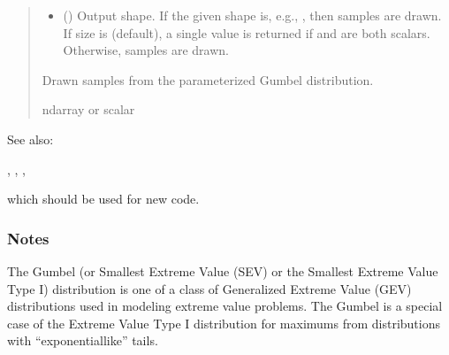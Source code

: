 \documentclass[letterpaper,10pt,english]{sphinxmanual}
\begin{document}
\begin{fulllineitems}
\begin{quote}
\begin{description}
\begin{itemize}
\item {} 
\sphinxAtStartPar
{} (\sphinxstyleliteralemphasis{\sphinxupquote{, }}) \textendash{} Output shape.  If the given shape is, e.g., , then
 samples are drawn.  If size is  (default),
a single value is returned if  and  are both scalars.
Otherwise,  samples are drawn.

\end{itemize}

\sphinxAtStartPar
{} \textendash{} Drawn samples from the parameterized Gumbel distribution.

\sphinxAtStartPar
ndarray or scalar

\end{description}\end{quote}


\begin{sphinxseealso}{See also:}

\sphinxAtStartPar
{}, , , {\hyperref[\detokenize{metilda.controllers:metilda.controllers.pitch_art_wizard.weibull}]{}}
\begin{description}
\sphinxAtStartPar
which should be used for new code.

\end{description}


\end{sphinxseealso}

\subsubsection*{Notes}

\sphinxAtStartPar
The Gumbel (or Smallest Extreme Value (SEV) or the Smallest Extreme
Value Type I) distribution is one of a class of Generalized Extreme
Value (GEV) distributions used in modeling extreme value problems.
The Gumbel is a special case of the Extreme Value Type I distribution
for maximums from distributions with “exponential\sphinxhyphen{}like” tails.


\end{fulllineitems}
\end{document}
